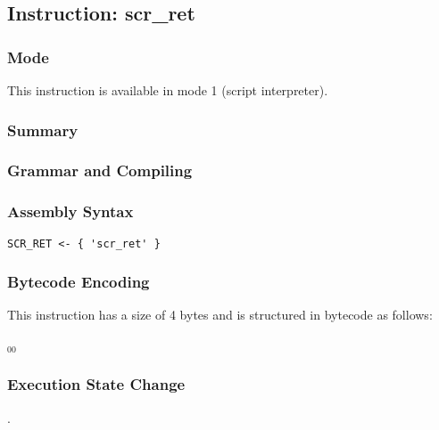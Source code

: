 \subsection{Instruction: scr\_ret}

\subsubsection{Mode}
This instruction is available in mode 1 (script interpreter).
\subsubsection{Summary}


\subsubsection{Grammar and Compiling}


\subsubsection{Assembly Syntax}

\begin{myquote}
\begin{verbatim}
SCR_RET <- { 'scr_ret' }
\end{verbatim}
\end{myquote}

\subsubsection{Bytecode Encoding}

This instruction has a size of 4 bytes and is structured in bytecode as follows:

$_{00}$\ 

\subsubsection{Execution State Change}

.


